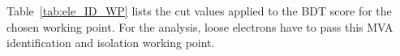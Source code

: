 Table~\ref{tab:ele_ID_WP} lists the cut values applied to the BDT score for the chosen working point.
For the analysis, loose electrons have to pass this MVA identification and isolation working point.


